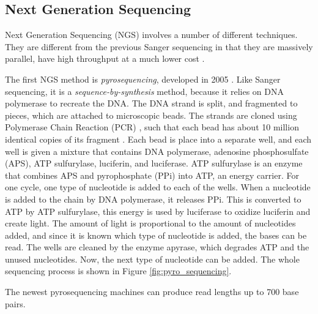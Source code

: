 \documentclass[../main/thesis.tex]{subfiles}
\begin{document}

\subsection{Next Generation Sequencing}
Next Generation Sequencing (NGS) involves a number of different techniques.
They are different from the previous Sanger sequencing in that they are massively parallel, have high throughput at a much lower cost \cite{ngs_history}.


The first NGS method is \textit{pyrosequencing}, developed in 2005 \cite{history_sequencing}.
Like Sanger sequencing, it is a \textit{sequence-by-synthesis} method, because it relies on DNA polymerase to recreate the DNA.
The DNA strand is split, and fragmented to pieces, which are attached to microscopic beads.
The strands are cloned using Polymerase Chain Reaction (PCR) \cite{dna_cloning}\cite{ngs_sequencing_atdbio}, such that each bead has about 10 million identical copies of its fragment \cite{pyro_sequencing2}.
Each bead is place into a separate well, and each well is given a mixture that contains DNA polymerase, adenosine phosphosulfate (APS), ATP sulfurylase, luciferin, and luciferase.
ATP sulfurylase is an enzyme that combines APS and pyrophosphate (PPi) into ATP, an energy carrier.
For one cycle, one type of nucleotide is added to each of the wells.
When a nucleotide is added to the chain by DNA polymerase, it releases PPi.
This is converted to ATP by ATP sulfurylase, this energy is used by luciferase to oxidize luciferin and create light.
The amount of light is proportional to the amount of nucleotides added, and since it is known which type of nucleotide is added, the bases can be read.
The wells are cleaned by the enzyme apyrase, which degrades ATP and the unused nucleotides.
Now, the next type of nucleotide can be added.
The whole sequencing process is shown in Figure \ref{fig:pyro_sequencing}.

The newest pyrosequencing machines can produce read lengths up to 700 base pairs.

\end{document}
